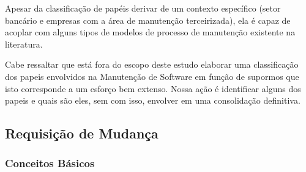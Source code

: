 Apesar da classificação de papéis derivar de um contexto específico (setor
bancário e empresas com a área de manutenção terceirizada), ela é capaz de
acoplar com alguns tipos de modelos de processo de manutenção existente na
literatura.


Cabe ressaltar que está fora do escopo deste estudo elaborar uma classificação
dos papeis envolvidos na Manutenção de Software em função de supormos que isto
corresponde a um esforço bem extenso. Nossa ação é identificar alguns dos papeis
e quais são eles, sem com isso, envolver em uma consolidação definitiva.

\subsection{Requisição de Mudança}
\label{sec:requisicao_de_mudanca}

\subsubsection{Conceitos Básicos}
\label{subsec:tipos_de_requisicoes_mudanca}




